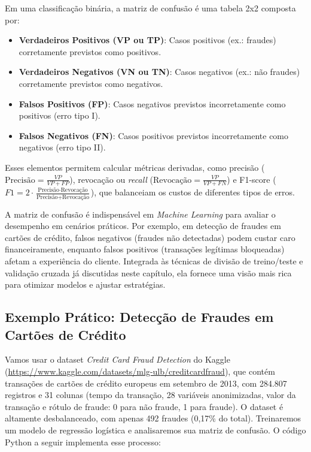 \documentclass[a4paper,12pt,openany]{book}
\begin{document}
Em uma classificação binária, a matriz de confusão é uma tabela 2x2 composta por:
\begin{itemize}
    \item \textbf{Verdadeiros Positivos (VP ou TP)}: Casos positivos (ex.: fraudes) corretamente previstos como positivos.
    \item \textbf{Verdadeiros Negativos (VN ou TN)}: Casos negativos (ex.: não fraudes) corretamente previstos como negativos.
    \item \textbf{Falsos Positivos (FP)}: Casos negativos previstos incorretamente como positivos (erro tipo I).
    \item \textbf{Falsos Negativos (FN)}: Casos positivos previstos incorretamente como negativos (erro tipo II).
\end{itemize}
Esses elementos permitem calcular métricas derivadas, como precisão ($\text{Precisão} = \frac{VP}{VP + FP}$), revocação ou \textit{recall} ($\text{Revocação} = \frac{VP}{VP + FN}$) e F1-score ($F1 = 2 \cdot \frac{\text{Precisão} \cdot \text{Revocação}}{\text{Precisão} + \text{Revocação}}$), que balanceiam os custos de diferentes tipos de erros.

A matriz de confusão é indispensável em \textit{Machine Learning} para avaliar o desempenho em cenários práticos. Por exemplo, em detecção de fraudes em cartões de crédito, falsos negativos (fraudes não detectadas) podem custar caro financeiramente, enquanto falsos positivos (transações legítimas bloqueadas) afetam a experiência do cliente. Integrada às técnicas de divisão de treino/teste e validação cruzada já discutidas neste capítulo, ela fornece uma visão mais rica para otimizar modelos e ajustar estratégias.

\subsection{Exemplo Prático: Detecção de Fraudes em Cartões de Crédito}
Vamos usar o dataset \textit{Credit Card Fraud Detection} do Kaggle (\url{https://www.kaggle.com/datasets/mlg-ulb/creditcardfraud}), que contém transações de cartões de crédito europeus em setembro de 2013, com 284.807 registros e 31 colunas (tempo da transação, 28 variáveis anonimizadas, valor da transação e rótulo de fraude: 0 para não fraude, 1 para fraude). O dataset é altamente desbalanceado, com apenas 492 fraudes (0,17\% do total). Treinaremos um modelo de regressão logística e analisaremos sua matriz de confusão. O código Python a seguir implementa esse processo:
\end{document}
